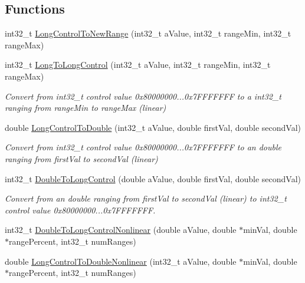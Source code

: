\subsection*{Functions}
\begin{DoxyCompactItemize}
\item 
int32\+\_\+t \mbox{\hyperlink{a00674_a5125f531cd70d1d4049c99335989a0ee}{Long\+Control\+To\+New\+Range}} (int32\+\_\+t a\+Value, int32\+\_\+t range\+Min, int32\+\_\+t range\+Max)
\item 
int32\+\_\+t \mbox{\hyperlink{a00674_abb594c44cd5d4dee1ec236f7c69adacb}{Long\+To\+Long\+Control}} (int32\+\_\+t a\+Value, int32\+\_\+t range\+Min, int32\+\_\+t range\+Max)
\begin{DoxyCompactList}\small\item\em Convert from int32\+\_\+t control value 0x80000000...0x7\+F\+F\+F\+F\+F\+FF to a int32\+\_\+t ranging from range\+Min to range\+Max (linear) \end{DoxyCompactList}\item 
double \mbox{\hyperlink{a00674_a8c8994b0486ed20075fd7808dc0bc01e}{Long\+Control\+To\+Double}} (int32\+\_\+t a\+Value, double first\+Val, double second\+Val)
\begin{DoxyCompactList}\small\item\em Convert from int32\+\_\+t control value 0x80000000...0x7\+F\+F\+F\+F\+F\+FF to an double ranging from first\+Val to second\+Val (linear) \end{DoxyCompactList}\item 
int32\+\_\+t \mbox{\hyperlink{a00674_a285ce2bf578a7ceb8c12eabbd5e5ad37}{Double\+To\+Long\+Control}} (double a\+Value, double first\+Val, double second\+Val)
\begin{DoxyCompactList}\small\item\em Convert from an double ranging from first\+Val to second\+Val (linear) to int32\+\_\+t control value 0x80000000...0x7\+F\+F\+F\+F\+F\+FF. \end{DoxyCompactList}\item 
int32\+\_\+t \mbox{\hyperlink{a00674_a76082aa640489b279cd7683c12fcbd33}{Double\+To\+Long\+Control\+Nonlinear}} (double a\+Value, double $\ast$min\+Val, double $\ast$range\+Percent, int32\+\_\+t num\+Ranges)
\item 
double \mbox{\hyperlink{a00674_a81279cd99c7d7193e4f79d5c74dccf54}{Long\+Control\+To\+Double\+Nonlinear}} (int32\+\_\+t a\+Value, double $\ast$min\+Val, double $\ast$range\+Percent, int32\+\_\+t num\+Ranges)
\item 

\end{DoxyCompactItemize}

